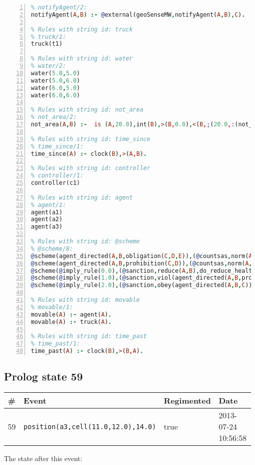 \documentclass[11pt]{article}\usepackage[utf8]{inputenc}\usepackage{geometry}
\begin{document}
\begin{lstlisting}[language=Prolog, numbers=left]
% Rules with string id: notifyAgent
% notifyAgent/2:
notifyAgent(A,B) :- @external(geoSenseMW,notifyAgent(A,B),C).

% Rules with string id: truck
% truck/1:
truck(t1)

% Rules with string id: water
% water/2:
water(5.0,5.0)
water(5.0,6.0)
water(6.0,5.0)
water(6.0,6.0)

% Rules with string id: not_area
% not_area/2:
not_area(A,B) :-  is (A,20.0),int(B),>(B,0.0),<(B,;(20.0,:(not_area(A,B), is (-(B),20.0)))),int(A),>(A,0.0),<(A,;(20.0,:(area(A,B),-(int(A))))),int(B),>(A,0.0),>(B,0.0),<(A,21.0),<(B,21.0).

% Rules with string id: time_since
% time_since/1:
time_since(A) :- clock(B),>(A,B).

% Rules with string id: controller
% controller/1:
controller(c1)

% Rules with string id: agent
% agent/1:
agent(a1)
agent(a2)
agent(a3)

% Rules with string id: @scheme
% @scheme/8:
@scheme(agent_directed(A,B,obligation(C,D,E)),(@countsas,norm(A,B,F,obligation(C,D,E)),F),false,(listTrue(C)),(time_past(D)),false,[plus(viol(agent_directed(A,B,obligation(C,D,E))))|[]],[plus(obey(agent_directed(A,B,obligation(C,D,E))))|[]])
@scheme(agent_directed(A,B,prohibition(C,D)),(@countsas,norm(A,B,E,prohibition(C,D)),E),(listTrue(C)),false,(false),false,[plus(viol(agent_directed(A,B,prohibition(C,D))))|[]],[plus(obey(agent_directed(A,B,prohibition(C,D))))|[]])
@scheme(@imply_rule(0.0),(@sanction,reduce(A,B),do_reduce_health(A,B),notifyAgent(A,changed(status))),true,false,false,false,[min(reduce(A,B))|[]],[])
@scheme(@imply_rule(1.0),(@sanction,viol(agent_directed(A,B,prohibition(C,D))),do_sanction(D)),true,false,false,false,[min(viol(agent_directed(A,B,prohibition(C,D))))|[]],[])
@scheme(@imply_rule(2.0),(@sanction,obey(agent_directed(A,B,C))),true,false,false,false,[min(obey(agent_directed(A,B,C)))|[]],[])

% Rules with string id: movable
% movable/1:
movable(A) :- agent(A).
movable(A) :- truck(A).

% Rules with string id: time_past
% time_past/1:
time_past(A) :- clock(B),>(B,A).

\end{lstlisting}
\clearpage 
\subsection{Prolog state 59}
\begin{table}[ht]
\centering 
\begin{tabular}{l l l l} 
\textbf{\#} & \textbf{Event} & \textbf{Regimented} & \textbf{Date} \\ [0.5ex] 
\hline
59&\texttt{position(a3,cell(11.0,12.0),14.0)}&true&2013-07-24 10:56:58\\ [1ex] \hline\end{tabular}
\end{table}
The state after this event:
\end{document}
